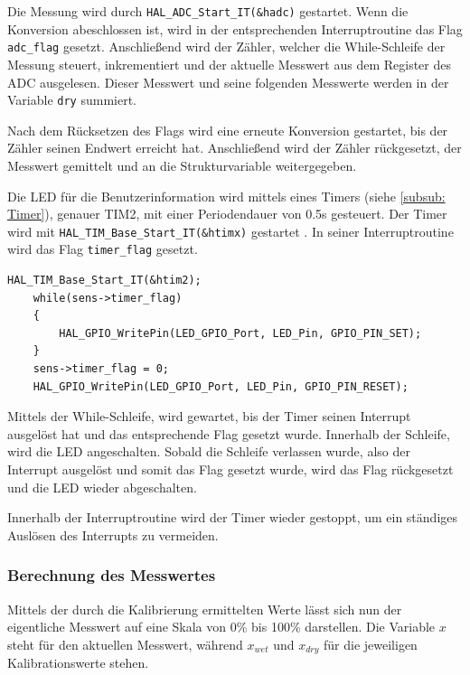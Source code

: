   Die Messung wird durch \lstinline!HAL_ADC_Start_IT(&hadc)! gestartet. Wenn die Konversion abeschlossen ist, wird in der entsprechenden Interruptroutine das Flag 
  \lstinline!adc_flag! gesetzt. Anschließend wird der Zähler, welcher die While-Schleife der Messung steuert, inkrementiert und der aktuelle Messwert aus dem Register
  des \ac{ADC} ausgelesen. Dieser Messwert und seine folgenden Messwerte werden in der Variable \lstinline!dry! summiert. 

  \smallskip

  Nach dem Rücksetzen des Flags wird eine erneute Konversion gestartet, bis der Zähler seinen Endwert erreicht hat. Anschließend wird der Zähler rückgesetzt, der Messwert
  gemittelt und an die Strukturvariable weitergegeben.

  \smallskip

  Die LED für die Benutzerinformation wird mittels eines Timers (siehe \ref{subsub: Timer}), genauer TIM2, mit einer Periodendauer von 0.5s gesteuert. Der Timer wird mit 
  \lstinline!HAL_TIM_Base_Start_IT(&htimx)! gestartet \citep{HAL_Description}. In seiner Interruptroutine wird das Flag \lstinline!timer_flag! gesetzt. 
  \begin{lstlisting}[caption={\textit{LED Timer}}]
    HAL_TIM_Base_Start_IT(&htim2);								 
    while(sens->timer_flag)
    {
        HAL_GPIO_WritePin(LED_GPIO_Port, LED_Pin, GPIO_PIN_SET);
    }
    sens->timer_flag = 0; 												
    HAL_GPIO_WritePin(LED_GPIO_Port, LED_Pin, GPIO_PIN_RESET);
  \end{lstlisting} 
  Mittels der While-Schleife, wird gewartet, bis der Timer seinen Interrupt ausgelöst hat und das entsprechende Flag gesetzt wurde. Innerhalb der Schleife, wird
  die LED angeschalten. Sobald die Schleife verlassen wurde, also der Interrupt ausgelöst und somit das Flag gesetzt wurde, wird das Flag rückgesetzt und die LED
  wieder abgeschalten.

  \smallskip

  Innerhalb der Interruptroutine wird der Timer wieder gestoppt, um ein ständiges Auslösen des Interrupts zu vermeiden.

  

  \subsubsection{Berechnung des Messwertes}
  Mittels der durch die Kalibrierung ermittelten Werte lässt sich nun der eigentliche Messwert auf eine Skala von 0\% bis
  100\% darstellen. Die Variable \(x\) steht für den aktuellen Messwert, während \(x_{wet}\) und \(x_{dry}\) für die jeweiligen Kalibrationswerte stehen. 

